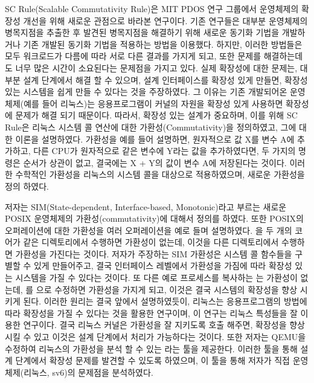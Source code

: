 SC Rule(Scalable Commutativity Rule)은 MIT PDOS 연구 그룹에서 운영체제의 확장성 개선을 위해 새로운
관점으로 바라본 연구이다.
기존 연구들은 대부분 운영체제의 병목지점을 추출한 후 발견된 병목지점을 해결하기 위해 새로운 
동기화 기법을 개발하거나 기존 개발된 동기화 기법을 적용하는 방법을 이용했다. 
하지만, 이러한 방법들은 모두 워크로드가 다름에 따라 서로 다른 결과를 가지게 되고, 
또한 문제를 해결하는데도 너무 많은 시간이 소요된다는 문제점을 가지고 있다.
실제 확장성에 대한 문제는, 대부분 설계 단계에서 해결 할 수 있으며, 설계 인터페이스를 확장성 있게 만들면, 
확장성 있는 시스템을 쉽게 만들 수 있다는 것을 주장하였다.
그 이유는 기존 개발되어온 운영체제(예를 들어 리눅스)는 응용프로그램이 커널의 자원을 
확장성 있게 사용하면 확장성에 문제가 해결 되기 때문이다. 
따라서, 확장성 있는 설계가 중요하며, 이를 위해 SC Rule은 리눅스 시스템 콜 연산에 대한 가환성(Commutativity)을 정의하였고, 
그에 대한 이론을 설명하였다.
가환성을 예를 들어 설명하면, 원자적으로 값 X를 변수 A에 추가하고, 
다른 CPU가 원자적으로 같은 변수에 Y라는 값을 추가하였다면, 
두 가지의 명령은 순서가 상관이 없고, 결국에는 X + Y의 값이 변수 A에 저장된다는 것이다.
이러한 수학적인 가환성을 리눅스의 시스템 콜을 대상으로 적용하였으며, 새로운 가환성을 정의 하였다.

저자는 SIM(State-dependent, Interface-based, Monotonic)라고 부르는 새로운
POSIX 운영체제의 가환성(commutativity)에 대해서 정의를 하였다.
또한 POSIX의 오퍼레이션에 대한 가환성을 여러 오퍼레이션을 예로 들며 설명하였다.
을 두 개의 코어가 같은 디렉토리에서 수행하면 가환성이 없는데, 
이것을 다른 디렉토리에서 수행하면 가환성을 가진다는 것이다.
저자가 주장하는 SIM 가환성은 시스템 콜 함수들을 구별할 수 있게 만들어주고, 결국 
인터페이스 레벨에서 가환성을 가짐에 따라 확장성 있는 시스템을 가질 수 있다는 것이다.  
또 다른 예로 프로세스를 복사하는 는 가환성이 없는데, 
를 으로 수정하면 가환성을 가지게 되고, 이것은 결국 
시스템의 확장성을 향상 시키게 된다. 
이러한 원리는 결국 앞에서 설명하였듯이, 리눅스는 응용프로그램의 방법에 따라 확장성을 가질 수 있다는 것을 
활용한 연구이며, 이 연구는 리눅스 특성들을 잘 이용한 연구이다. 
결국 리눅스 커널은 가환성을 잘 지키도록 호출 해주면, 확장성을 향상 시킬 수 있고 
이것은 설계 단계에서 처리가 가능하다는 것이다. 
또한 저자는 QEMU을 수정하여 리눅스의 가환성을 분석 할 수 있는 라는 툴을 제공한다. 
이러한 툴을 통해 설계 단계에서 확장성 문제를 발견할 수 있도록 하였으며, 이 툴을 통해 저자가 
직접 운영체제(리눅스, sv6)의 문제점을 분석하였다. 
